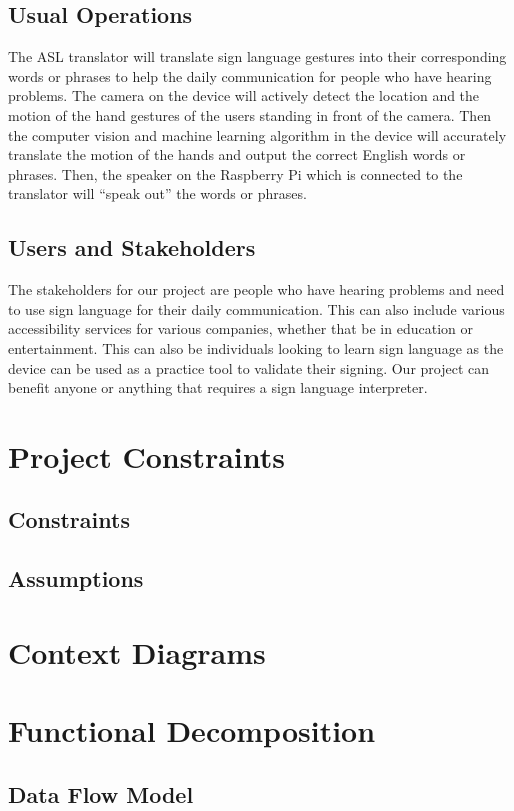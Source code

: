 \documentclass[12pt]{article}
\begin{document}
\subsection{Usual Operations}
The ASL translator will translate sign language gestures into their corresponding words or phrases to help the daily communication for people who have hearing problems. The camera on the device will actively detect the location and the motion of the hand gestures of the users standing in front of the camera. Then the computer vision and machine learning algorithm in the device will accurately translate the motion of the hands and output the correct English words or phrases. Then, the speaker on the Raspberry Pi which is connected to the translator will “speak out” the words or phrases. 

\subsection{Users and Stakeholders}
The stakeholders for our project are people who have hearing problems and need to use sign language for their daily communication. This can also include various accessibility services for various companies, whether that be in education or entertainment. This can also be individuals looking to learn sign language as the device can be used as a practice tool to validate their signing. Our project can benefit anyone or anything that requires a sign language interpreter.
\section{Project Constraints}
\subsection{Constraints}

\subsection{Assumptions}

\section{Context Diagrams}

\section{Functional Decomposition}
\subsection{Data Flow Model}
\end{document}
